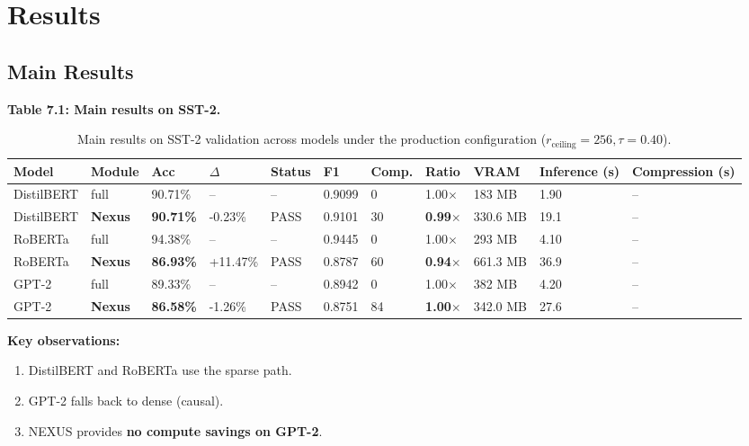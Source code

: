 \section{Results}

\subsection{Main Results}

\textbf{Table 7.1: Main results on SST-2.}

\begin{table}[t]
\centering
\small
\begin{tabular}{lllllllllll}
\toprule
\textbf{Model} & \textbf{Module} & \textbf{Acc} & \textbf{$\Delta$} & \textbf{Status} & \textbf{F1} & \textbf{Comp.} & \textbf{Ratio} & \textbf{VRAM} & \textbf{Inference (s)} & \textbf{Compression (s)} \\
\midrule
DistilBERT & full & 90.71\% & -- & -- & 0.9099 & 0 & 1.00$\times$ & 183 MB & 1.90 & -- \\
DistilBERT & \textbf{Nexus} & \textbf{90.71\%} & -0.23\% & PASS & 0.9101 & 30 & \textbf{0.99$\times$} & 330.6 MB & 19.1 & -- \\
RoBERTa & full & 94.38\% & -- & -- & 0.9445 & 0 & 1.00$\times$ & 293 MB & 4.10 & -- \\
RoBERTa & \textbf{Nexus} & \textbf{86.93\%} & +11.47\% & PASS & 0.8787 & 60 & \textbf{0.94$\times$} & 661.3 MB & 36.9 & -- \\
GPT-2 & full & 89.33\% & -- & -- & 0.8942 & 0 & 1.00$\times$ & 382 MB & 4.20 & -- \\
GPT-2 & \textbf{Nexus} & \textbf{86.58\%} & -1.26\% & PASS & 0.8751 & 84 & \textbf{1.00$\times$} & 342.0 MB & 27.6 & -- \\
\bottomrule
\end{tabular}
\caption{Main results on SST-2 validation across models under the production configuration ($r_{\mathrm{ceiling}}=256, \tau=0.40$).}
\label{tab:main_sst2}
\end{table}

\textbf{Key observations:}

\begin{enumerate}
\item DistilBERT and RoBERTa use the sparse path.
\item GPT-2 falls back to dense (causal).
\item NEXUS provides \textbf{no compute savings on GPT-2}.

\end{enumerate}
